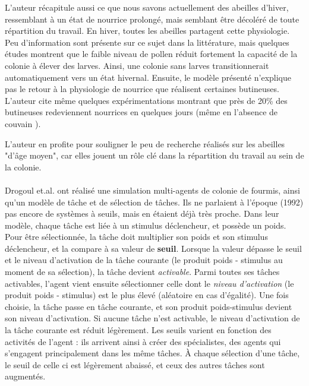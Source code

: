         L'auteur récapitule aussi ce que nous savons actuellement des abeilles d'hiver, ressemblant à un état de nourrice prolongé, mais semblant être décoléré de toute répartition du travail. En hiver, toutes les abeilles partagent cette physiologie. Peu d'information sont présente sur ce sujet dans la littérature, mais quelques études montrent que le faible niveau de pollen réduit fortement la capacité de la colonie à élever des larves. Ainsi, une colonie sans larves transitionnerait automatiquement vers un état hivernal. Ensuite, le modèle présenté n'explique pas le retour à la physiologie de nourrice que réalisent certaines butineuses. L'auteur cite même quelques expérimentations montrant que près de 20\% des butineuses redeviennent nourrices en quelques jours (même en l'absence de couvain \cite{huang_regulation_1996}).
        
        L'auteur en profite pour souligner le peu de recherche réalisés sur les abeilles "d'âge moyen", car elles jouent un rôle clé dans la répartition du travail au sein de la colonie.
        
        \paragraph{}
        Drogoul et.al. \cite{drogoul_multi-agent_1992} ont réalisé une simulation multi-agents de colonie de fourmis, ainsi qu'un modèle de tâche et de sélection de tâches. Ils ne parlaient à l'époque (1992) pas encore de systèmes à seuils, mais en étaient déjà très proche. Dans leur modèle, chaque tâche est liée à un stimulus déclencheur, et possède un poids. Pour être sélectionnée, la tâche doit multiplier son poids et son stimulus déclencheur, et la compare à sa valeur de \textbf{seuil}. Lorsque la valeur dépasse le seuil et le niveau d'activation de la tâche courante (le produit poids - stimulus au moment de sa sélection), la tâche devient \textit{activable}. Parmi toutes ses tâches activables, l'agent vient ensuite sélectionner celle dont le \textit{niveau d'activation} (le produit poids - stimulus) est le plus élevé (aléatoire en cas d'égalité). Une fois choisie, la tâche passe en tâche courante, et son produit poids-stimulus devient son niveau d'activation. Si aucune tâche n'est activable, le niveau d'activation de la tâche courante est réduit légèrement. Les seuils varient en fonction des activités de l'agent : ils arrivent ainsi à créer des spécialistes, des agents qui s'engagent principalement dans les même tâches. À chaque sélection d'une tâche, le seuil de celle ci est légèrement abaissé, et ceux des autres tâches sont augmentés.
        
